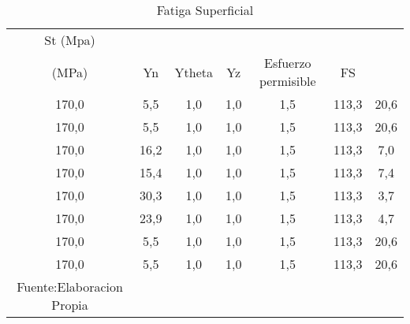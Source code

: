 \begin{longtable}{|c|c|c|c|c|c|c|}
\hline
\rowcolor[HTML]{EFEFEF} 
St  (Mpa) & \begin{tabular}[c]{@{}c@{}}Esfuerzo AGMA \\   (MPa)\end{tabular} & Yn  & Ytheta & Yz  & Esfuerzo permisible & FS   \\ \hline
170,0     & 5,5                                                              & 1,0 & 1,0    & 1,5 & 113,3               & 20,6 \\ \hline
170,0     & 5,5                                                              & 1,0 & 1,0    & 1,5 & 113,3               & 20,6 \\ \hline
170,0     & 16,2                                                             & 1,0 & 1,0    & 1,5 & 113,3               & 7,0  \\ \hline
170,0     & 15,4                                                             & 1,0 & 1,0    & 1,5 & 113,3               & 7,4  \\ \hline
170,0     & 30,3                                                             & 1,0 & 1,0    & 1,5 & 113,3               & 3,7  \\ \hline
170,0     & 23,9                                                             & 1,0 & 1,0    & 1,5 & 113,3               & 4,7  \\ \hline
170,0     & 5,5                                                              & 1,0 & 1,0    & 1,5 & 113,3               & 20,6 \\ \hline
170,0     & 5,5                                                              & 1,0 & 1,0    & 1,5 & 113,3               & 20,6 \\ \hline
\caption{Fatiga Superficial}{Fuente:Elaboracion Propia}
\label{table:fatiga_Superficial}
\end{longtable}
